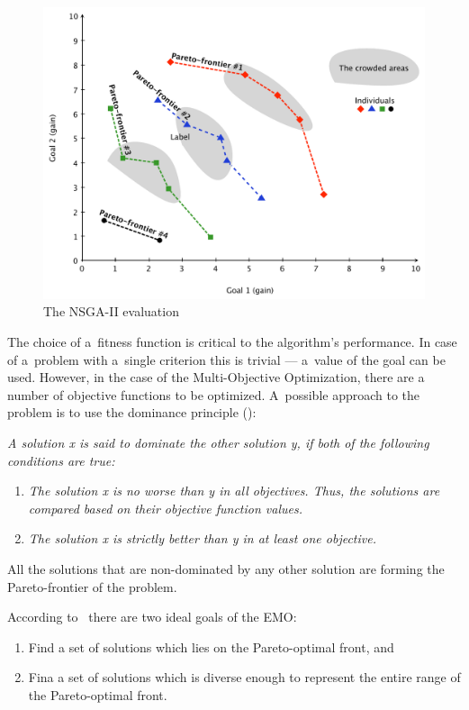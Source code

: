 \begin{figure}
  \centering \includegraphics[scale=0.55]{img/nsga}
  \caption{The NSGA-II evaluation}
  \label{nsga}
\end{figure}

The choice of a~fitness function is critical to the algorithm's
performance. In case of a~problem with a~single criterion this is trivial ---
a~value of the goal can be used. However, in the case of the Multi-Objective
Optimization, there are a number of objective functions to be
optimized. A~possible approach to the problem is to use the dominance
principle (\cite{Gol89}):

\vspace{0.5cm} \textit{A solution x is said to dominate the other solution y,
  if both of the following conditions are true:}
\begin{enumerate}
\item \textit{The solution x is no worse than y in all objectives. Thus, the
    solutions are compared based on their objective function values.}
\item \textit{The solution x is strictly better than y in at least one
    objective.}
\end{enumerate}

All the solutions that are non-dominated by any other solution are forming the
Pareto-frontier of the problem.

According to~\cite{Deb08} there are two ideal goals of the EMO:
\begin{enumerate}
\item Find a set of solutions which lies on the Pareto-optimal front, and
\item Fina a set of solutions which is diverse enough to represent the entire
  range of the Pareto-optimal front.
\end{enumerate}

